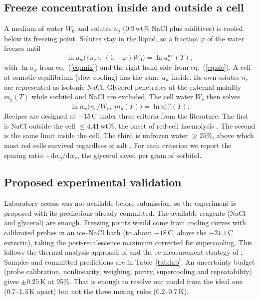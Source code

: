 \documentclass[10pt,a4paper,twocolumn]{article}
\begin{document}
\subsection{Freeze concentration inside and outside a cell}
A medium of water $W_0$ and solutes $n_j$ (0.9\,wt\% NaCl plus additives) is cooled below its freezing point.
Solutes stay in the liquid, so a fraction $\varphi$ of the water freezes until
\begin{equation}
\ln a_w\big(\{n_j\},\,(1-\varphi)W_0\big)=\ln a_w^{\mathrm{ice}}(T),
\label{eq:balance}
\end{equation}
with $\ln a_w$ from eq.~(\ref{eq:mix}) and the right-hand side from eq.~(\ref{eq:sle}). A cell at osmotic
equilibrium (slow cooling) has the same $a_w$ inside. Its own solutes $n_c$ are represented as isotonic NaCl.
Glycerol penetrates at the external molality $m_g(T)$ while sorbitol and NaCl are excluded. The cell water
$W_c$ then solves
\begin{equation}
\ln a_w\big(n_c/W_c,\;m_g(T)\big)=\ln a_w^{\mathrm{ice}}(T).
\label{eq:cell}
\end{equation}
Recipes are designed at $-15$\,\textdegree C \cite{gao} under three criteria from the literature. The first is
NaCl outside the cell $\le4.41$\,wt\%, the onset of red-cell haemolysis \cite{lovelock11,shepard}. The second
is the same limit inside the cell. The third is unfrozen water $\ge25\%$, above which most red cells survived
regardless of salt \cite{mazur81}. For each criterion we report the sparing ratio $-\mathrm{d}w_g/\mathrm{d}w_s$,
the glycerol saved per gram of sorbitol.

\subsection{Proposed experimental validation}\label{sec:val}
Laboratory access was not available before submission, so the experiment is proposed with its predictions
already committed. The available reagents (NaCl and glycerol) are enough. Freezing points would come from
cooling curves with calibrated probes in an ice--NaCl bath (to about $-18$\,\textdegree C, above the
$-21.1$\,\textdegree C eutectic), taking the post-recalescence maximum corrected for supercooling. This follows
the thermal-analysis approach of \cite{shepard} and the re-measurement strategy of \cite{benson}. Samples and
committed predictions are in Table~\ref{tab:lab}. An uncertainty budget (probe calibration, nonlinearity,
weighing, purity, supercooling and repeatability) gives $\pm0.25$\,K at 95\%. That is enough to resolve our
model from the ideal one (0.7--1.3\,K apart) but not the three mixing rules (0.2--0.7\,K).
\end{document}
